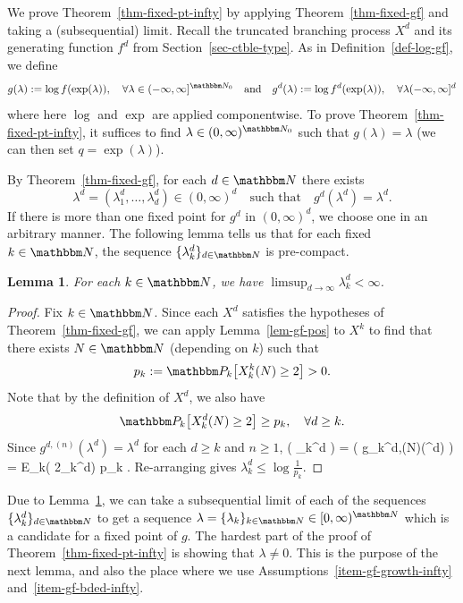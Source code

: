 \documentclass[11pt]{article}
\theoremstyle{plain}
\newtheorem{lem}[thm]{Lemma}
\theoremstyle{definition}
\numberwithin{equation}{section}
\def\alb#1\ale{\begin{align*}#1\end{align*}}
\newcommand{\eqb}{\begin{equation}}
\newcommand{\eqe}{\end{equation}}
\newcommand{\eqbn}{\begin{equation*}}
\newcommand{\eqen}{\end{equation*}}
\newcommand{\BB}{\mathbbm}
\let\originalleft\left
\let\originalright\right
\renewcommand{\left}{\mathopen{}\mathclose\bgroup\originalleft}
\renewcommand{\right}{\aftergroup\egroup\originalright}
\begin{document}
We prove Theorem~\ref{thm-fixed-pt-infty} by applying Theorem~\ref{thm-fixed-gf} and taking a (subsequential) limit.
Recall the truncated branching process $X^d$ and its generating function $f^d$ from Section~\ref{sec-ctble-type}. 
As in Definition~\ref{def-log-gf}, we define
\eqb \label{eqn-log-gf-infty}
g(\lambda) := \log f(\exp(\lambda)) ,\quad\forall \lambda \in (-\infty,\infty]^{\BB N_0} \quad \text{and} \quad 
g^d(\lambda) := \log f^d(\exp(\lambda)) ,\quad\forall \lambda (-\infty,\infty]^d
\eqe 
where here $\log$ and $\exp$ are applied componentwise. To prove Theorem~\ref{thm-fixed-pt-infty}, it suffices to find $\lambda \in (0,\infty)^{\BB N_0}$ such that $g(\lambda) = \lambda$ (we can then set $q = \exp(\lambda)$). 
 
By Theorem~\ref{thm-fixed-gf}, for each $d\in\BB N$ there exists 
\eqb \label{eqn-fixed-pt-trunc}
\lambda^d = (\lambda^d_1,\dots,\lambda^d_d) \in (0,\infty)^d \quad \text{such that} \quad g^d(\lambda^d) = \lambda^d .
\eqe 
If there is more than one fixed point for $g^d$ in $(0,\infty)^d$, we choose one in an arbitrary manner. The following lemma tells us that for each fixed $k\in\BB N$, the sequence $\{\lambda_k^d\}_{d\in\BB N}$ is pre-compact. 

\begin{lem} \label{lem-fixed-limsup}
For each $k \in \BB N$, we have $\limsup_{d\to\infty} \lambda_k^d < \infty$. 
\end{lem}
\begin{proof}
Fix $k\in\BB N$. 
Since each $X^d$ satisfies the hypotheses of Theorem~\ref{thm-fixed-gf}, we can apply Lemma~\ref{lem-gf-pos} to $X^k$ to find that there exists $N\in\BB N$ (depending on $k$) such that
\eqbn
p_k := \BB P_k\left[ X_k^k(N) \geq 2 \right]  > 0 . 
\eqen
Note that by the definition of $X^d$, we also have
\eqbn
  \BB P_k\left[ X_k^d(N) \geq 2 \right]  \geq p_k  ,\quad\forall d\geq k. 
\eqen
Since $g^{d,(n)}(\lambda^d) =\lambda^d$ for each $d\geq k$ and $n\geq 1$, 
\alb
\exp( \lambda_k^d ) 
= \exp\left( g_k^{d,(N)}(\lambda^d) \right) 
=  \BB E_k\left[ \exp\left( \sum_{j=1}^d \lambda_j^d X_j^d(N) \right) \right] 
\geq \exp( 2\lambda_k^d) p_k  .
\ale
Re-arranging gives $\lambda_k^d \leq \log\frac{1}{p_k }$.  
\end{proof}

Due to Lemma~\ref{lem-fixed-limsup}, we can take a subsequential limit of each of the sequences $\{\lambda_k^d\}_{d\in\BB N}$ to get a sequence $\lambda  = \{\lambda_k\}_{k\in\BB N} \in [0,\infty)^{\BB N}$ which is a candidate for a fixed point of $g$. 
The hardest part of the proof of Theorem~\ref{thm-fixed-pt-infty} is showing that $\lambda \not= 0$. This is the purpose of the next lemma, and also the place where we use Assumptions~\ref{item-gf-growth-infty} and~\ref{item-gf-bded-infty}. 
 
\end{document}
